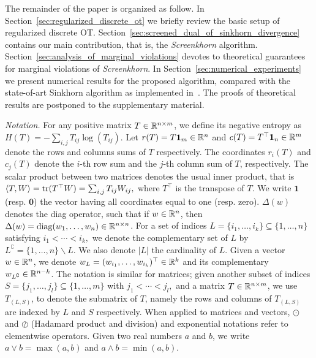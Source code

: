 The remainder of the paper is organized as follow. In Section~\ref{sec:regularized_discrete_ot} we briefly review the basic setup of regularized discrete OT. 
Section~\ref{sec:screened_dual_of_sinkhorn_divergence} contains our main contribution, that is, the \emph{Screenkhorn} algorithm. 
Section~\ref{sec:analysis_of_marginal_violations} devotes to theoretical guarantees for marginal violations of \emph{Screenkhorn}. 
In Section~\ref{sec:numerical_experiments} we present numerical results for the proposed algorithm, compared with the state-of-art Sinkhorn algorithm as implemented in~\cite{flamary2017pot}. 
The proofs of theoretical results are postponed to the supplementary material.

\emph{Notation.} For any positive matrix $T \in {\mathbb{R}}^{n\times m}$, we define its negative entropy as $H(T) = -\sum_{i,j} T_{ij} \log(T_{ij}).$
Let $r(T) = T\mathbf 1_m \in {\mathbb{R}}^n$ and $c(T) = T^\top\mathbf 1_n \in {\mathbb{R}}^m$ denote the rows and columns sums of $T$ respectively. The coordinates $r_i(T)$ and $c_j(T)$ denote the $i$-th row sum and the $j$-th column sum of $T$, respectively.
The scalar product between two matrices denotes the usual inner product, that is $\langle T, W \rangle = \text{tr}(T^\top W) = \sum_{i,j}T_{ij}W_{ij},$ where $T^\top$ is the transpose of $T$. 
We write $\mathbf{1}$ (resp. $\mathbf{0}$) the vector having all coordinates equal to one (resp. zero).
$\Delta(w)$ denotes the diag operator, such that if $w \in {\mathbb{R}}^n$, then $\Delta(w) = \text{diag}(w_1, \ldots, w_n)\in {\mathbb{R}}^{n\times n}$.
For a set of indices $L=\{i_1, \ldots, i_k\} \subseteq \{1, \ldots, n\}$ satisfying $i_1 < \cdots <i_k,$ we denote the complementary set of $L$ by $L^\complement = \{1, \ldots, n\} \backslash L$. We also denote $|L|$ the cardinality of $L$.
Given a vector $w \in {\mathbb{R}}^n$, we denote $w_L= (w_{i_1}, \ldots, w_{i_k})^\top \in {\mathbb{R}}^k$ and its complementary $w_{L^\complement} \in {\mathbb{R}}^{n- k}$.  The notation is similar for matrices; given another subset of indices $S = \{j_1, \ldots, j_l\} \subseteq \{1, \ldots, m\}$ with $j_1 < \cdots <j_l,$ and a matrix $T\in {\mathbb{R}}^{n\times m}$, we use $T_{(L,S)}$, to denote the submatrix of $T$, namely the rows and columns of $T_{(L,S)}$ are indexed by $L$ and $S$ respectively.
When applied to matrices and vectors,  $\odot$ and $\oslash$ (Hadamard product and division) and exponential notations refer to elementwise operators.
Given two real numbers $a$ and $b$, we write $a\vee b = \max(a,b)$ and $a\wedge b = \min(a,b).$

